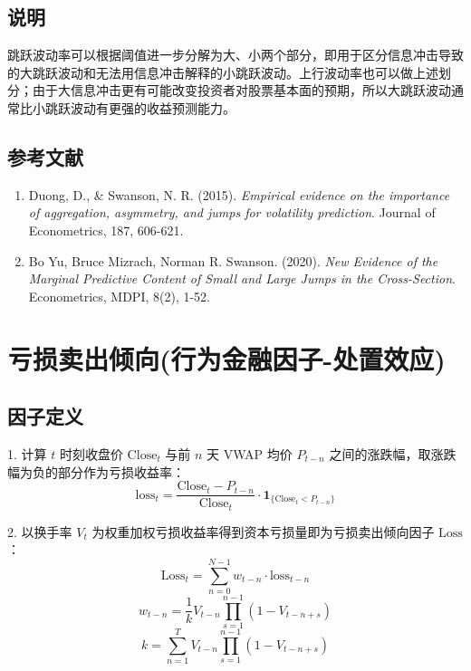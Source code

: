\documentclass{article}
\begin{document}
\subsection{说明}
跳跃波动率可以根据阈值进一步分解为大、小两个部分，即用于区分信息冲击导致的大跳跃波动和无法用信息冲击解释的小跳跃波动。上行波动率也可以做上述划分；由于大信息冲击更有可能改变投资者对股票基本面的预期，所以大跳跃波动通常比小跳跃波动有更强的收益预测能力。

\subsection{参考文献}
\begin{enumerate}
    \item Duong, D., \& Swanson, N. R. (2015). \textit{Empirical evidence on the importance of aggregation, asymmetry, and jumps for volatility prediction}. Journal of Econometrics, 187, 606-621.
    \item Bo Yu, Bruce Mizrach, Norman R. Swanson. (2020). \textit{New Evidence of the Marginal Predictive Content of Small and Large Jumps in the Cross-Section}. Econometrics, MDPI, 8(2), 1-52.
\end{enumerate}

\section{亏损卖出倾向(行为金融因子-处置效应)}

\subsection{因子定义}

1. 计算 \( t \) 时刻收盘价 \( \mathrm{Close}_t \) 与前 \( n \) 天 VWAP 均价 \( P_{t-n} \) 之间的涨跌幅，取涨跌幅为负的部分作为亏损收益率：
\begin{equation}
    \mathrm{loss}_t = \frac{\mathrm{Close}_t - P_{t-n}}{\mathrm{Close}_t} \cdot \mathbf{1}_{\{\mathrm{Close}_t < P_{t-n}\}}
\end{equation}

2. 以换手率 \( V_t \) 为权重加权亏损收益率得到资本亏损量即为亏损卖出倾向因子 \( \mathrm{Loss} \)：
\begin{equation}
    \mathrm{Loss}_t = \sum_{n=0}^{N-1} w_{t-n} \cdot \mathrm{loss}_{t-n}
\end{equation}
\begin{equation}
    w_{t-n} = \frac{1}{k} V_{t-n} \prod_{s=1}^{n-1} (1 - V_{t-n+s})
\end{equation}
\begin{equation}
    k = \sum_{n=1}^{T} V_{t-n} \prod_{s=1}^{n-1} (1 - V_{t-n+s})
\end{equation}
\end{document}
